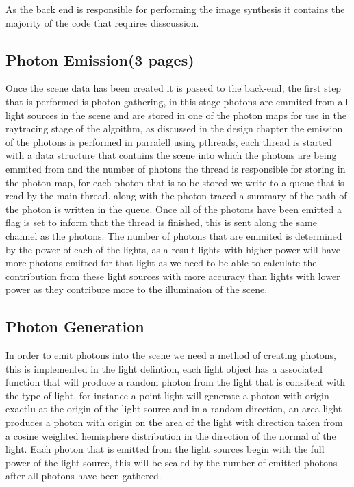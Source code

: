 As the back end is responsible for performing the image synthesis it contains the majority of the code that requires disscussion.

\subsection{Photon Emission(3 pages)}
Once the scene data has been created it is passed to the back-end, the first step that is performed is photon gathering,
in this stage photons are emmited from all light sources in the scene and are stored in one of the photon maps for use
in the raytracing stage of the algoithm, as discussed in the design chapter the emission of the photons is performed in
parralell using pthreads, each thread is started with a data structure that contains the scene into which the photons
are being emmited from and the number of photons the thread is responsible for storing in the photon map, for each photon
that is to be stored we write to a queue that is read by the main thread. along with the photon traced a summary of the
path of the photon is written in the queue. Once all of the photons have been emitted a flag is set to inform that the
thread is finished, this is sent along the same channel as the photons. The number of photons that are emmited is determined
by the power of each of the lights, as a result lights with higher power will have more photons emitted for that light as
we need to be able to calculate the contribution from these light sources with more accuracy than lights with lower power
as they contribure more to the illuminaion of the scene.

\subsection{Photon Generation}
In order to emit photons into the scene we need a method of creating photons, this is implemented in the light defintion,
each light object has a associated function that will produce a random photon from the light that is consitent with the
type of light, for instance a point light will generate a photon with origin exactlu at the origin of the light source and
in a random direction, an area light produces a photon with origin on the area of the light with direction taken from a
cosine weighted hemisphere distribution in the direction of the normal of the light. Each photon that is emitted from the
light sources begin with the full power of the light source, this will be scaled by the number of emitted photons after
all photons have been gathered.

